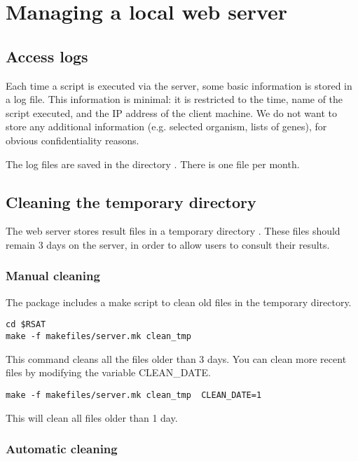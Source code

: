 \documentclass[12pt,a4paper, twoside]{scrreprt} %
\begin{document}
\section{Managing a local web server}

\subsection{Access logs}

Each time a script is executed via the \RSAT server, some basic
information is stored in a log file. This information is minimal: it
is restricted to the time, name of the script executed, and the IP
address of the client machine. We do not want to store any additional
information (e.g. selected organism, lists of genes), for obvious
confidentiality reasons.

The log files are saved in the directory . There
is one file per month.


\subsection{Cleaning the temporary directory}

The web server stores result files in a temporary directory
. These files should remain 3 days on
the server, in order to allow users to consult their results.

\subsubsection{Manual cleaning}

The \RSAT package includes a make script to clean old files in the
temporary directory.

\begin{lstlisting}
cd $RSAT
make -f makefiles/server.mk clean_tmp
\end{lstlisting}

This command cleans all the files older than 3 days. You can clean
more recent files by modifying the variable CLEAN\_DATE.

\begin{lstlisting}
make -f makefiles/server.mk clean_tmp  CLEAN_DATE=1
\end{lstlisting}

This will clean all files older than 1 day.

\subsubsection{Automatic cleaning}
\end{document}
